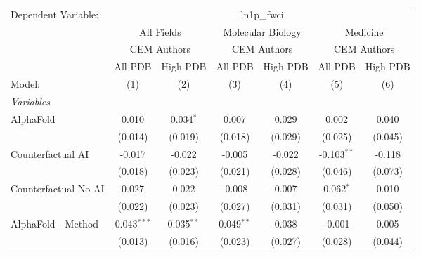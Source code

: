 \begingroup
\centering
\begin{tabular}{lcccccc}
   \tabularnewline \midrule \midrule
   Dependent Variable: & \multicolumn{6}{c}{ln1p\_fwci}\\
 & \multicolumn{2}{c}{All Fields} & \multicolumn{2}{c}{Molecular Biology} & \multicolumn{2}{c}{Medicine} \\
\cmidrule(lr){2-3} \cmidrule(lr){4-5} \cmidrule(lr){6-7}
 & \multicolumn{2}{c}{CEM Authors} & \multicolumn{2}{c}{CEM Authors} & \multicolumn{2}{c}{CEM Authors} \\
\cmidrule(lr){2-3} \cmidrule(lr){4-5} \cmidrule(lr){6-7}
 & \multicolumn{1}{c}{All PDB} & \multicolumn{1}{c}{High PDB} & \multicolumn{1}{c}{All PDB} & \multicolumn{1}{c}{High PDB} & \multicolumn{1}{c}{All PDB} & \multicolumn{1}{c}{High PDB} \\
\cmidrule(lr){2-2} \cmidrule(lr){3-3} \cmidrule(lr){4-4} \cmidrule(lr){5-5} \cmidrule(lr){6-6} \cmidrule(lr){7-7}
   Model:                                                     & (1)           & (2)          & (3)          & (4)          & (5)           & (6)\\  
   \midrule
   \emph{Variables}\\
   AlphaFold                                                  & 0.010         & 0.034$^{*}$  & 0.007        & 0.029        & 0.002         & 0.040\\   
                                                              & (0.014)       & (0.019)      & (0.018)      & (0.029)      & (0.025)       & (0.045)\\   
   Counterfactual AI                                          & -0.017        & -0.022       & -0.005       & -0.022       & -0.103$^{**}$ & -0.118\\   
                                                              & (0.018)       & (0.023)      & (0.021)      & (0.028)      & (0.046)       & (0.073)\\   
   Counterfactual No AI                                       & 0.027         & 0.022        & -0.008       & 0.007        & 0.062$^{*}$   & 0.010\\   
                                                              & (0.022)       & (0.023)      & (0.027)      & (0.031)      & (0.031)       & (0.050)\\   
   AlphaFold - Method                                         & 0.043$^{***}$ & 0.035$^{**}$ & 0.049$^{**}$ & 0.038        & -0.001        & 0.005\\   
                                                              & (0.013)       & (0.016)      & (0.023)      & (0.027)      & (0.028)       & (0.044)\\   

\end{tabular}
